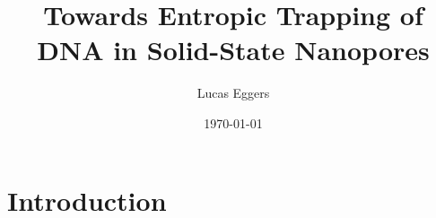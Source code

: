 \documentclass[aps,prl,preprint,groupedaddress]{revtex4}
\begin{document}

\title{Towards Entropic Trapping of DNA in Solid-State Nanopores}


\author{Lucas Eggers}


\date{\today}

\begin{abstract}
\end{abstract}

\pacs{}

\maketitle

\section{Introduction}
\end{document}
